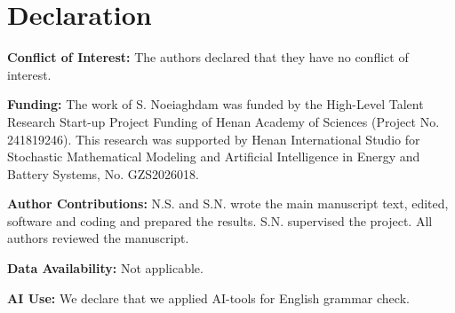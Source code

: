 \documentclass{article}
\theoremstyle{plain}
\theoremstyle{definition}
\numberwithin{equation}{section}
\begin{document}
\section*{Declaration}

\noindent \textbf{Conflict of Interest:} The authors declared that they have no conflict of interest.

\noindent \textbf{Funding:}
The work of S. Noeiaghdam was funded by the High-Level Talent Research Start-up Project Funding of Henan Academy of Sciences (Project No. 241819246). This research was supported by Henan International Studio for Stochastic Mathematical Modeling and Artificial Intelligence in Energy and Battery Systems, No. GZS2026018. 

\noindent \textbf{Author Contributions:} N.S. and S.N. wrote the main manuscript text, edited, software and coding and prepared the results. S.N. supervised the project. All authors reviewed the manuscript.


\noindent \textbf{Data Availability:} Not applicable. 

\noindent \textbf{AI Use:} We declare that we applied AI-tools for English grammar check. 
\end{document}

